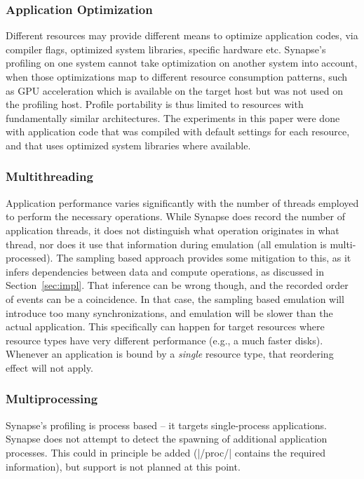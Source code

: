 \documentclass[10pt, conference, compsocconf]{IEEEtran}
\newcommand{\I}[1]{\textit{#1}\xspace}
\newcommand{\synapse}{Synapse\xspace}
\begin{document}
 \subsubsection{Application Optimization}  Different resources may
 provide different means to optimize application codes, via compiler
 flags, optimized system libraries, specific hardware etc.  \synapse's profiling on one
 system cannot take optimization on another system into account, when
 those optimizations map to different resource consumption patterns,
 such as GPU acceleration which is available on the target host but
 was not used on the profiling host.  Profile portability is thus
 limited to resources with fundamentally similar architectures.
 The experiments in this paper were done with application code that
 was compiled with default settings for each resource, and that uses
 optimized system libraries where available.

 \subsubsection{Multithreading}  Application performance varies
 significantly with the number of threads employed to perform the
 necessary operations.  While \synapse does record the number of
 application threads, it does not distinguish what operation
 originates in what thread, nor does it use that information during
 emulation (all emulation is multi-processed).  The sampling based
 approach provides some mitigation to this, as it infers dependencies
 between data and compute operations, as discussed in
 Section~\ref{sec:impl}.  That inference can be wrong though, and the
 recorded order of events can be a coincidence.  In that case, the
 sampling based emulation will introduce too many synchronizations,
 and emulation will be slower than the actual application.  This specifically can
  happen for target resources where resource types have
 very different performance (e.g., a much faster disks).  Whenever an
 application is bound by a \I{single} resource type, that
 reordering effect will not apply.

 \subsubsection{Multiprocessing}  \synapse's profiling is process
 based -- it targets single-process applications.  \synapse does not
 attempt to detect the spawning of additional application processes.
 This could in principle be added (|/proc/| contains the required
 information), but support is not planned at this point.
\end{document}

